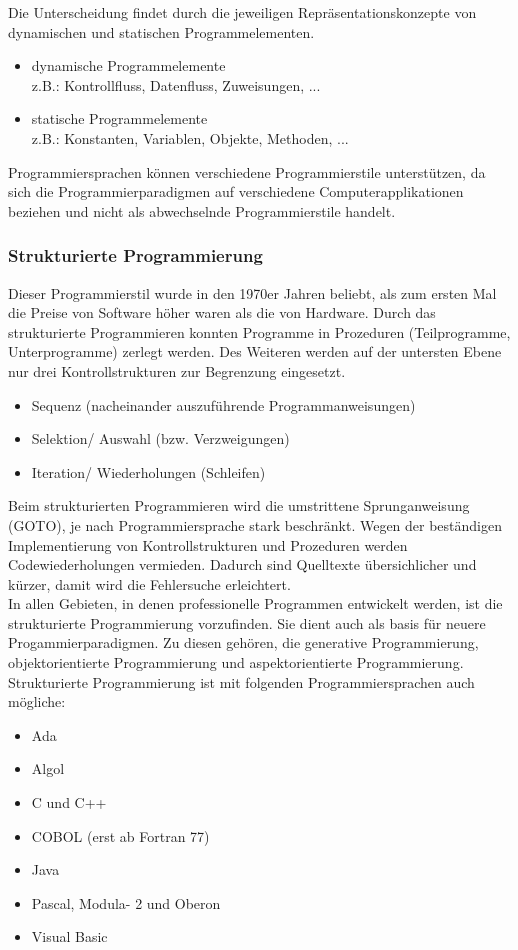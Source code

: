 \documentclass[12pt,a4paper]{report}
\begin{document}
\begin{onehalfspace}
Die Unterscheidung findet durch die jeweiligen Repräsentationskonzepte von dynamischen und statischen Programmelementen.
\begin{itemize}
\item dynamische Programmelemente\\
z.B.: Kontrollfluss, Datenfluss, Zuweisungen, ...
\item statische Programmelemente\\
z.B.: Konstanten, Variablen, Objekte, Methoden, ...
\end{itemize}
Programmiersprachen können verschiedene Programmierstile unterstützen, da sich die Programmierparadigmen auf verschiedene Computerapplikationen beziehen und nicht als abwechselnde Programmierstile handelt.

\subsubsection{Strukturierte Programmierung}
Dieser Programmierstil wurde in den 1970er Jahren beliebt, als zum ersten Mal die Preise von Software höher waren als die von Hardware. Durch das strukturierte Programmieren konnten Programme in Prozeduren (Teilprogramme, Unterprogramme) zerlegt werden. Des Weiteren werden auf der untersten Ebene nur drei Kontrollstrukturen zur Begrenzung eingesetzt.
\begin{itemize}
\item Sequenz (nacheinander auszuführende Programmanweisungen)
\item Selektion/ Auswahl (bzw. Verzweigungen)
\item Iteration/ Wiederholungen (Schleifen)
\end{itemize}
Beim strukturierten Programmieren wird die umstrittene Sprunganweisung (GOTO), je nach Programmiersprache stark beschränkt. Wegen der beständigen Implementierung von Kontrollstrukturen und Prozeduren werden Codewiederholungen vermieden. Dadurch sind Quelltexte übersichlicher und kürzer, damit wird die Fehlersuche erleichtert.\\

In allen Gebieten, in denen professionelle Programmen entwickelt werden, ist die strukturierte Programmierung vorzufinden. Sie dient auch als basis für neuere Progammierparadigmen. Zu diesen gehören, die generative Programmierung, objektorientierte Programmierung und aspektorientierte Programmierung.
\\Strukturierte Programmierung ist mit folgenden Programmiersprachen auch mögliche:
\begin{itemize}
\item Ada
\item Algol
\item C und C++
\item COBOL (erst ab Fortran 77)
\item Java
\item Pascal, Modula- 2 und Oberon
\item Visual Basic
\end{itemize}


\end{onehalfspace}
\end{document}
